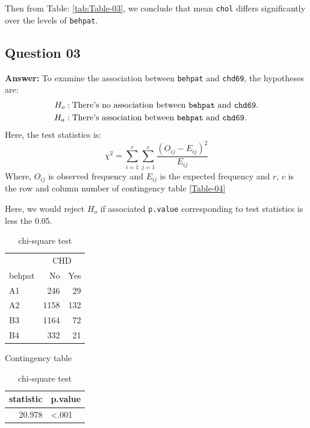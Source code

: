 \documentclass[
  12pt,
  oneside]{article}
\begin{document}
Then from Table: \ref{tab:Table-03}, we conclude that mean \texttt{chol} differs significantly over the levels of \texttt{behpat}.

\clearpage

\hypertarget{question-03}{%
\subsection{Question 03}\label{question-03}}

\textbf{Answer:} To examine the association between \texttt{behpat} and \texttt{chd69}, the hypotheses are:
\begin{align*}
H_o&: \text{There's no association between \texttt{behpat} and \texttt{chd69}.} \\
H_a&: \text{There's association between \texttt{behpat} and \texttt{chd69}.}
\end{align*}
Here, the test statistics is:
\[
\chi^2 = \sum_{i=1}^{r}\sum_{j=1}^{c}\frac{(O_{ij} - E_{ij})^2}{E_{ij}}
\]
Where, \(O_{ij}\) is observed frequency and \(E_{ij}\) is the expected frequency and \(r\), \(c\) is the row and column number of contingency table \ref{Table-04}

Here, we would reject \(H_o\) if associated \texttt{p.value} corresponding to test statistics
is less the 0.05.

\begin{table}[H]
      \begin{minipage}{.5\linewidth}
      \centering
\begin{tabular}{lrr}
\toprule
\multicolumn{1}{c}{ } & \multicolumn{2}{c}{CHD} \\
\cmidrule(l{3pt}r{3pt}){2-3}
behpat & No & Yes\\
\midrule
A1 & 246 & 29\\
A2 & 1158 & 132\\
B3 & 1164 & 72\\
B4 & 332 & 21\\
\bottomrule
\end{tabular}\caption{Contingency table}
      \label{Table-04}
    \end{minipage}%
      \begin{minipage}{.5\linewidth}
        \centering
\begin{tabular}{rl}
\toprule
statistic & p.value\\
\midrule
20.978 & <.001\\
\bottomrule
\end{tabular}\caption{chi-square test}
    \label{Table-05}
    \end{minipage}
      \end{table}
\end{document}
